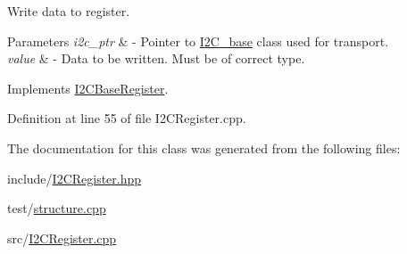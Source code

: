 Write data to register. 


\begin{DoxyParams}{Parameters}
{\em i2c\+\_\+ptr} & -\/ Pointer to \hyperlink{class_i2_c__base}{I2\+C\+\_\+base} class used for transport. \\
\hline
{\em value} & -\/ Data to be written. Must be of correct type. \\
\hline
\end{DoxyParams}


Implements \hyperlink{class_i2_c_base_register_ad3f9f1404fe6af3e10e8f204b16d2066}{I2\+C\+Base\+Register}.



Definition at line 55 of file I2\+C\+Register.\+cpp.



The documentation for this class was generated from the following files\+:\begin{DoxyCompactItemize}
\item 
include/\hyperlink{_i2_c_register_8hpp}{I2\+C\+Register.\+hpp}\item 
test/\hyperlink{structure_8cpp}{structure.\+cpp}\item 
src/\hyperlink{_i2_c_register_8cpp}{I2\+C\+Register.\+cpp}\end{DoxyCompactItemize}
